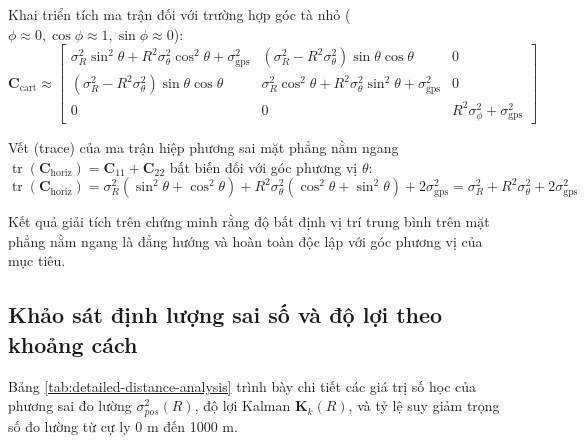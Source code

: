 Khai triển tích ma trận đối với trường hợp góc tà nhỏ ($\phi \approx 0, \cos\phi \approx 1, \sin\phi \approx 0$):
\begin{equation}
\mathbf{C}_{\text{cart}} \approx \begin{bmatrix}
\sigma_R^2 \sin^2\theta + R^2 \sigma_{\theta}^2 \cos^2\theta + \sigma_{\text{gps}}^2 & (\sigma_R^2 - R^2 \sigma_{\theta}^2) \sin\theta \cos\theta & 0 \\
(\sigma_R^2 - R^2 \sigma_{\theta}^2) \sin\theta \cos\theta & \sigma_R^2 \cos^2\theta + R^2 \sigma_{\theta}^2 \sin^2\theta + \sigma_{\text{gps}}^2 & 0 \\
0 & 0 & R^2 \sigma_{\phi}^2 + \sigma_{\text{gps}}^2
\end{bmatrix}
\label{eq:expanded-cartesian-covariance}
\end{equation}

Vết (trace) của ma trận hiệp phương sai mặt phẳng nằm ngang $\operatorname{tr}(\mathbf{C}_{\text{horiz}}) = \mathbf{C}_{11} + \mathbf{C}_{22}$ bất biến đối với góc phương vị $\theta$:
\begin{equation}
\operatorname{tr}(\mathbf{C}_{\text{horiz}}) = \sigma_R^2 (\sin^2\theta + \cos^2\theta) + R^2 \sigma_{\theta}^2 (\cos^2\theta + \sin^2\theta) + 2\sigma_{\text{gps}}^2 = \sigma_R^2 + R^2 \sigma_{\theta}^2 + 2\sigma_{\text{gps}}^2
\label{eq:trace-invariance}
\end{equation}

Kết quả giải tích trên chứng minh rằng độ bất định vị trí trung bình trên mặt phẳng nằm ngang là đẳng hướng và hoàn toàn độc lập với góc phương vị của mục tiêu.

\subsection{Khảo sát định lượng sai số và độ lợi theo khoảng cách}

\hspace{0.5cm} Bảng \ref{tab:detailed-distance-analysis} trình bày chi tiết các giá trị số học của phương sai đo lường $\sigma_{pos}^2(R)$, độ lợi Kalman $\mathbf{K}_k(R)$, và tỷ lệ suy giảm trọng số đo lường từ cự ly 0 m đến 1000 m.

